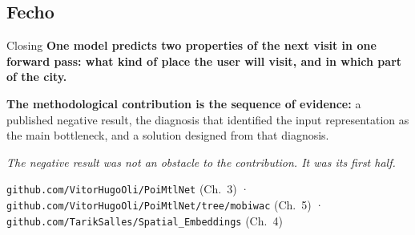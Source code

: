 \documentclass{beamer}
\begin{document}
\subsection{Fecho}

%
{
\specialframe
\begin{frame}{Closing}
    \vfill
    {\large\textbf{One model predicts two properties of the next visit in one forward pass: what kind of place the user will visit, and in which part of the city.}}

    \bigskip

    \textbf{The methodological contribution is the sequence of evidence:} a published negative result, the diagnosis that identified the input representation as the main bottleneck, and a solution designed from that diagnosis.

    \bigskip

    \textit{The negative result was not an obstacle to the contribution. It was its first half.}
    \vfill
    {\scriptsize\texttt{github.com/VitorHugoOli/PoiMtlNet} (Ch.~3) · \texttt{github.com/VitorHugoOli/PoiMtlNet/tree/mobiwac} (Ch.~5) · \texttt{github.com/TarikSalles/Spatial\_Embeddings} (Ch.~4)\par}
    \vspace{2mm}
\end{frame}
}
\end{document}

